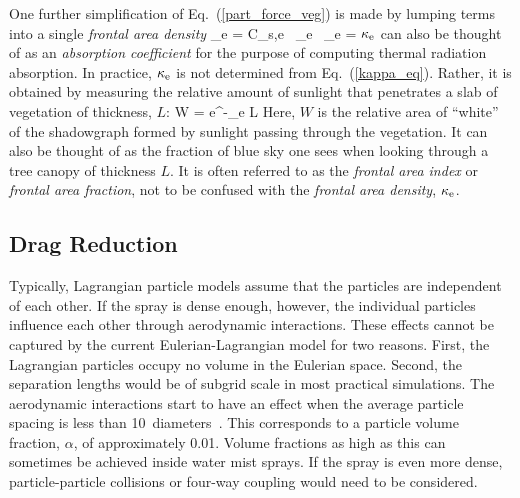 One further simplification of Eq.~(\ref{part_force_veg}) is made by lumping terms into a single {\em frontal area density}
\be
   \kappa_{\rm e} = C_{\rm s,e} \,  \beta_{\rm e} \, \sigma_{\rm e} =  \label{kappa_eq}
\ee
$\kappa_{\rm e}$ can also be thought of as an {\em absorption coefficient} for the purpose of computing thermal radiation absorption. In practice, $\kappa_{\rm e}$ is not determined from Eq.~(\ref{kappa_eq}). Rather, it is obtained by measuring the relative amount of sunlight that penetrates a slab of vegetation of thickness, $L$:
\be
   W = {\rm e}^{-\kappa_{\rm e} L}
\ee
Here, $W$ is the relative area of ``white'' of the shadowgraph formed by sunlight passing through the vegetation. It can also be thought of as the fraction of blue sky one sees when looking through a tree canopy of thickness $L$. It is often referred to as the {\em frontal area index} or {\em frontal area fraction}, not to be confused with the {\em frontal area density}, $\kappa_{\rm e}$.

\subsection{Drag Reduction}
\label{sec:threeway}

Typically, Lagrangian particle models assume that the particles are independent of each other. If the spray is dense enough, however, the individual particles influence each other through aerodynamic interactions. These effects cannot be captured by the current Eulerian-Lagrangian model for two reasons. First, the Lagrangian particles occupy no volume in the Eulerian space. Second, the separation lengths would be of subgrid scale in most practical simulations. The aerodynamic interactions start to have an effect when the average particle spacing is less than 10~diameters~\cite{Prahl:1,Prahl:2}. This corresponds to a particle volume fraction, $\alpha$, of approximately 0.01. Volume fractions as high as this can sometimes be achieved inside water mist sprays. If the spray is even more dense, particle-particle collisions or four-way coupling would need to be considered.

